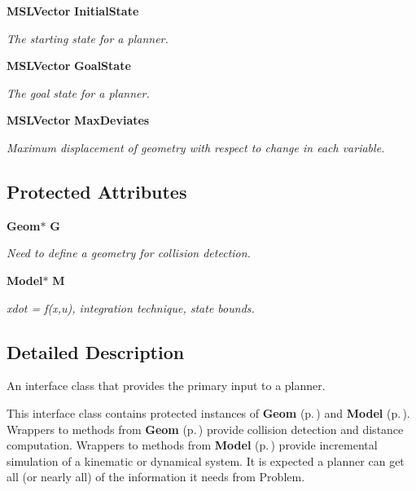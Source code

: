 \begin{CompactItemize}
{\bf MSLVector} {\bf Initial\-State}
\begin{CompactList}\small\item\em The starting state for a planner.\item\end{CompactList}\item 
{\bf MSLVector} {\bf Goal\-State}
\begin{CompactList}\small\item\em The goal state for a planner.\item\end{CompactList}\item 
{\bf MSLVector} {\bf Max\-Deviates}
\begin{CompactList}\small\item\em Maximum displacement of geometry with respect to change in each variable.\item\end{CompactList}\end{CompactItemize}
\subsection*{Protected Attributes}
\begin{CompactItemize}
\item 
{\bf Geom}$\ast$ {\bf G}
\begin{CompactList}\small\item\em Need to define a geometry for collision detection.\item\end{CompactList}\item 
{\bf Model}$\ast$ {\bf M}
\begin{CompactList}\small\item\em xdot = f(x,u), integration technique, state bounds.\item\end{CompactList}\end{CompactItemize}


\subsection{Detailed Description}
An interface class that provides the primary input to a planner.

This interface class contains protected instances of {\bf Geom} {\rm (p.\,\pageref{class_Geom})} and {\bf Model} {\rm (p.\,\pageref{class_Model})}. Wrappers to methods from {\bf Geom} {\rm (p.\,\pageref{class_Geom})} provide collision detection and distance computation. Wrappers to methods from {\bf Model} {\rm (p.\,\pageref{class_Model})} provide incremental simulation of a kinematic or dynamical system. It is expected a planner can get all (or nearly all) of the information it needs from Problem. 



